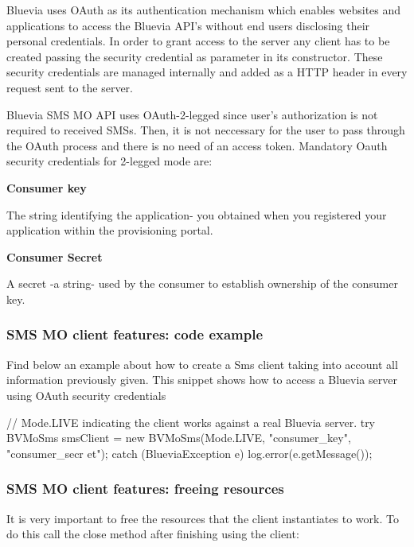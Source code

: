 Bluevia uses OAuth as its authentication mechanism which enables websites and applications to access the Bluevia API's without end users disclosing their personal credentials. In order to grant access to the server any client has to be created passing the security credential as parameter in its constructor. These security credentials are managed internally and added as a HTTP header in every request sent to the server.

Bluevia SMS MO API uses OAuth-\/2-\/legged since user's authorization is not required to received SMSs. Then, it is not neccessary for the user to pass through the OAuth process and there is no need of an access token. Mandatory Oauth security credentials for 2-\/legged mode are:


\begin{DoxyItemize}
\item {\bfseries Consumer key} \par
The string identifying the application-\/ you obtained when you registered your application within the provisioning portal.


\item {\bfseries Consumer Secret} \par
A secret -\/a string-\/ used by the consumer to establish ownership of the consumer key. 
\end{DoxyItemize}\hypertarget{blv_sms_mo_guide_sms_mo_client_features_code_examples_sec}{}\subsubsection{SMS MO client features: code example}\label{blv_sms_mo_guide_sms_mo_client_features_code_examples_sec}
Find below an example about how to create a Sms client taking into account all information previously given. This snippet shows how to access a Bluevia server using OAuth security credentials


\begin{DoxyCode}
// Mode.LIVE indicating the client works against a real Bluevia server.
try {
        BVMoSms smsClient = new BVMoSms(Mode.LIVE, "consumer_key", "consumer_secr
      et");
} catch (BlueviaException e){
        log.error(e.getMessage());
}
\end{DoxyCode}
\hypertarget{blv_sms_mo_guide_sms_mo_client_features_freeing_resources_sec}{}\subsubsection{SMS MO client features: freeing resources}\label{blv_sms_mo_guide_sms_mo_client_features_freeing_resources_sec}
It is very important to free the resources that the client instantiates to work. To do this call the close method after finishing using the client:


